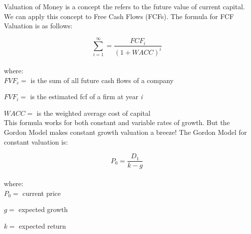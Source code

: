 \documentclass[a4paper,12pt]{article}
\begin{document}
\pagestyle{headings}


Valuation of Money is a concept the refers to the future value of
current capital. We can apply this concept to Free Cash Flows
(FCFs). The formula for FCF Valuation is as follows:

\[ \sum_{i=1}^\infty = \frac{FCF_i}{(1+WACC)^i} \]
\\
where:\\

$FVF_c =$ is the sum of all future cash flows of a company

$FVF_i =$ is the estimated fcf of a firm at year \textit{i}

$WACC =$ is the weighted average cost of capital\\

This formula works for both constant and variable rates of growth.
But the Gordon Model makes constant growth valuation a breeze!
The Gordon Model for constant valuation is:

\[ P_0 = \frac{D_1}{k-g} \]
\\
where:\\

$P_0 =$ current price

$g =$ expected growth

$k=$ expected return
\end{document}
